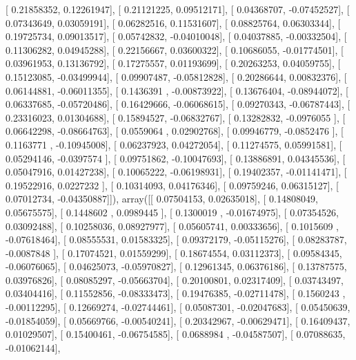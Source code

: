 \documentclass{article}
\begin{document}
       [ 0.21858352,  0.12261947],
       [ 0.21121225,  0.09512171],
       [ 0.04368707, -0.07452527],
       [ 0.07343649,  0.03059191],
       [ 0.06282516,  0.11531607],
       [ 0.08825764,  0.06303344],
       [ 0.19725734,  0.09013517],
       [ 0.05742832, -0.04010048],
       [ 0.04037885, -0.00332504],
       [ 0.11306282,  0.04945288],
       [ 0.22156667,  0.03600322],
       [ 0.10686055, -0.01774501],
       [ 0.03961953,  0.13136792],
       [ 0.17275557,  0.01193699],
       [ 0.20263253,  0.04059755],
       [ 0.15123085, -0.03499944],
       [ 0.09907487, -0.05812828],
       [ 0.20286644,  0.00832376],
       [ 0.06144881, -0.06011355],
       [ 0.1436391 , -0.00873922],
       [ 0.13676404, -0.08944072],
       [ 0.06337685, -0.05720486],
       [ 0.16429666, -0.06068615],
       [ 0.09270343, -0.06787443],
       [ 0.23316023,  0.01304688],
       [ 0.15894527, -0.06832767],
       [ 0.13282832, -0.0976055 ],
       [ 0.06642298, -0.08664763],
       [ 0.0559064 ,  0.02902768],
       [ 0.09946779, -0.0852476 ],
       [ 0.1163771 , -0.10945008],
       [ 0.06237923,  0.04272054],
       [ 0.11274575,  0.05991581],
       [ 0.05294146, -0.0397574 ],
       [ 0.09751862, -0.10047693],
       [ 0.13886891,  0.04345536],
       [ 0.05047916,  0.01427238],
       [ 0.10065222, -0.06198931],
       [ 0.19402357, -0.01141471],
       [ 0.19522916,  0.0227232 ],
       [ 0.10314093,  0.04176346],
       [ 0.09759246,  0.06315127],
       [ 0.07012734, -0.04350887]]), array([[ 0.07504153,  0.02635018],
       [ 0.14808049,  0.05675575],
       [ 0.1448602 ,  0.0989445 ],
       [ 0.1300019 , -0.01674975],
       [ 0.07354526,  0.03092488],
       [ 0.10258036,  0.08927977],
       [ 0.05605741,  0.00333656],
       [ 0.1015609 , -0.07618464],
       [ 0.08555531,  0.01583325],
       [ 0.09372179, -0.05115276],
       [ 0.08283787, -0.0087848 ],
       [ 0.17074521,  0.01559299],
       [ 0.18674554,  0.03112373],
       [ 0.09584345, -0.06076065],
       [ 0.04625073, -0.05970827],
       [ 0.12961345,  0.06376186],
       [ 0.13787575,  0.03976826],
       [ 0.08085297, -0.05663704],
       [ 0.20100801,  0.02317409],
       [ 0.03743497,  0.03404416],
       [ 0.11552856, -0.08333473],
       [ 0.19476385, -0.02711478],
       [ 0.1560243 , -0.00112295],
       [ 0.12669274, -0.02744461],
       [ 0.05087301, -0.02047683],
       [ 0.05450639, -0.01854059],
       [ 0.05669766, -0.00540241],
       [ 0.20342967, -0.00629471],
       [ 0.16409437,  0.01029507],
       [ 0.15400461, -0.06754585],
       [ 0.0688984 , -0.04587507],
       [ 0.07088635, -0.01062144],
\end{document}
